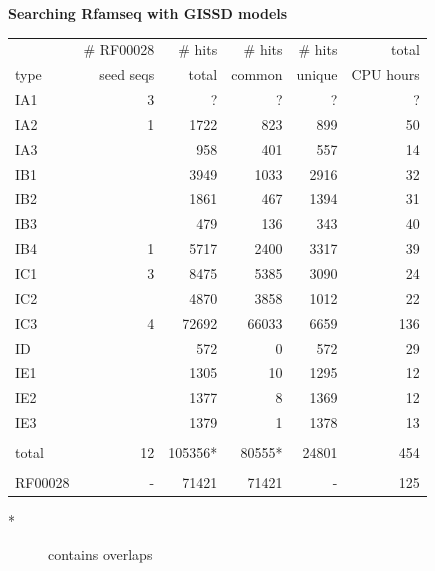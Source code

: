 \documentclass[landscape]{slides}
\begin{document}
\begin{slide}
\begin{center}
\small
\textbf{Searching Rfamseq with GISSD models}
\end{center}

\small
\begin{center}
\begin{tabular}{l|r|rrr|r}
\tt
        & \# RF00028 & \# hits   & \# hits& \# hits& total     \\
type    & seed seqs  & total     & common & unique & CPU hours \\ \hline
IA1     & 3          & ?         & ?      & ?      & ? \\
IA2     & 1          &  1722     & 823    & 899    & 50 \\
IA3     &            &   958     & 401    & 557    & 14 \\
IB1     &            &  3949     & 1033   & 2916   & 32 \\
IB2     &            & 1861     & 467    & 1394   & 31 \\
IB3     &            & 479     & 136    & 343    & 40 \\
IB4     &  1         & 5717     & 2400   & 3317   & 39 \\
IC1     &  3         & 8475     & 5385   & 3090   & 24 \\
IC2     &            & 4870     & 3858   & 1012   & 22 \\
IC3     & 4          & 72692     & 66033  & 6659   & 136 \\
ID      &            & 572     & 0      & 572    & 29 \\
IE1     &            & 1305     & 10     & 1295   & 12 \\
IE2     &            & 1377     & 8      & 1369   & 12 \\
IE3     &            & 1379     & 1      & 1378   & 13 \\
        &            &          &        &        &    \\
total   & 12         & 105356*   & 80555* & 24801  & 454 \\
        &           &           &        &    \\
RF00028 & -         & 71421     & 71421  & -      & 125 \\
\end{tabular}

\begin{description}
\item[*] contains overlaps
\end{description}

\end{center}

\vfill
\end{slide}
\end{document}
